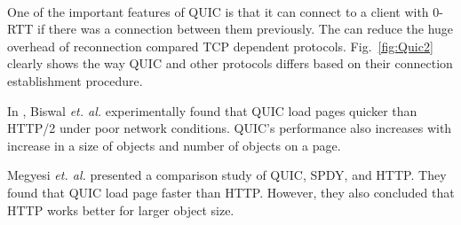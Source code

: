 \paragraph{} One of the important features of QUIC is that it can connect to a client with 0-RTT if there was a connection between them previously. The can reduce the huge overhead of reconnection compared TCP dependent protocols. Fig.~\ref{fig:Quic2}\cite{quicisquic} clearly shows the way QUIC and other protocols differs based on their connection establishment procedure. 
%
%

In \cite{quicmakewebfast}, Biswal \textit{et. al.} experimentally found that QUIC load pages quicker than HTTP/2 under poor network conditions. QUIC's performance also increases with increase in a size of objects and number of objects on a page.

Megyesi \textit{et. al.} presented a comparison study of QUIC, SPDY, and HTTP\cite{quicisquic}. They found that QUIC load page faster than HTTP. However, they also concluded that HTTP works better for larger object size.